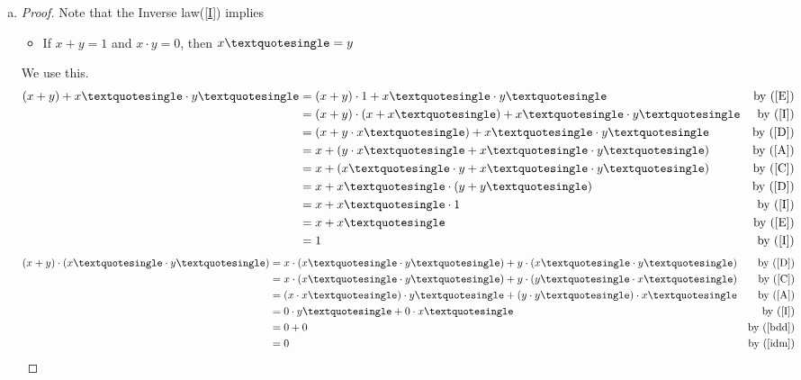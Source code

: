 \begin{enumerate} [(a)]
\begin{proof}
		\end{proof}
		\item \begin{proof}
			Note that the Inverse law(\ref{I}) implies
			\begin{itemize}
				\item [] If $x + y = 1$ and $x\cdot y = 0$, then $x\textquotesingle = y$
			\end{itemize}
			We use this.\\
			\begin{align*}
				(x + y) + x\textquotesingle\cdot y\textquotesingle &= (x+y)\cdot1 + x\textquotesingle\cdot y\textquotesingle &\text{by (\ref{E})}\\
				&= (x+y)\cdot(x+x\textquotesingle) + x\textquotesingle\cdot y\textquotesingle &\text{by (\ref{I})}\\
				&= (x + y\cdot x\textquotesingle) + x\textquotesingle\cdot y\textquotesingle &\text{by (\ref{D})}\\
				&= x + (y\cdot x\textquotesingle + x\textquotesingle\cdot y\textquotesingle) &\text{by (\ref{A})}\\
				&= x + (x\textquotesingle\cdot y + x\textquotesingle\cdot y\textquotesingle) &\text{by (\ref{C})}\\
				&= x + x\textquotesingle\cdot(y + y\textquotesingle) &\text{by (\ref{D})}\\
				&= x + x\textquotesingle\cdot1 &\text{by (\ref{I})}\\
				&= x + x\textquotesingle &\text{by (\ref{E})}\\
				&= 1 &\text{by (\ref{I})}
			\end{align*}
			\begin{align*}
				(x + y)\cdot (x\textquotesingle\cdot y\textquotesingle) &= x\cdot(x\textquotesingle\cdot y\textquotesingle) + y\cdot(x\textquotesingle\cdot y\textquotesingle) &\text{by (\ref{D})}\\
				&= x\cdot(x\textquotesingle\cdot y\textquotesingle) + y\cdot(y\textquotesingle\cdot x\textquotesingle) &\text{by (\ref{C})}\\
				&= (x\cdot x\textquotesingle)\cdot y\textquotesingle + (y\cdot y\textquotesingle)\cdot x\textquotesingle &\text{by (\ref{A})}\\
				&= 0\cdot y\textquotesingle + 0\cdot x\textquotesingle &\text{by (\ref{I})}\\
				&= 0 + 0 &\text{by (\ref{bdd})}\\
				&= 0 &\text{by (\ref{idm})}
			\end{align*}

\end{proof}
\end{enumerate}
